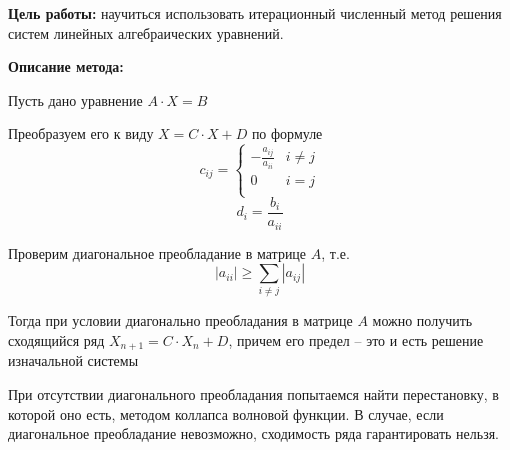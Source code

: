 \documentclass[11pt]{article}
\begin{document}
    

    \textbf{Цель работы:}
    научиться использовать итерационный численный метод решения систем линейных алгебраических уравнений.

    \textbf{Описание метода:}

    Пусть дано уравнение $A\cdot X=B$

    Преобразуем его к виду $X=C\cdot X+D$
    по формуле
    \[ c_{ij}=\left\{
    \begin{array}{cl}
        -\frac{a_{ij}}{a_{ii}} & i \neq j \\
        0 & i = j \\
    \end{array}
    \right. \]
    \[ d_i=\frac{b_i}{a_{ii}} \]

    Проверим диагональное преобладание в матрице $A$, т.е.
    \[ |a_{ii}|\geq \sum_{i\ne j} |a_{ij}| \]

    Тогда при условии диагонально преобладания в матрице $A$ можно получить сходящийся ряд
    $X_{n+1}=C\cdot X_n+D$, причем его предел -- это и есть решение изначальной системы

    При отсутствии диагонального преобладания попытаемся найти перестановку, в которой оно есть,
    методом коллапса волновой функции.
    В случае, если диагональное преобладание невозможно, сходимость ряда гарантировать нельзя.

    \lstset{
        extendedchars,
        numbers=left,
        basicstyle=\ttfamily\small,
        numberstyle=\ttfamily\small,
        inputencoding=cp1251
    }
    
\end{document}
